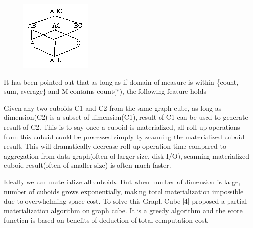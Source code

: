 \begin {figure}[H]
\centering
\includegraphics[scale=1]{pic/22.png}
\end{figure}

It has been pointed out that as long as if domain of measure is within \{count, sum, average\} and M contains count(*), the following feature holds:
 
Given any two cuboids C1 and C2 from the same graph cube, as long as dimension(C2) is a subset of dimension(C1), result of C1 can be used to generate result of C2. This is to say once a cuboid is materialized, all roll-up operations from this cuboid could be processed simply by scanning the materialized cuboid result. This will dramatically decrease roll-up operation time compared to aggregation from data graph(often of larger size, disk I/O), scanning materialized cuboid result(often of smaller size) is often much faster.


 
Ideally we can materialize all cuboids. But when number of dimension is large, number of cuboids grows exponentially, making total materialization impossible due to overwhelming space cost. To solve this Graph Cube [4] proposed a partial materialization algorithm on graph cube. It is a greedy algorithm and the score function is based on benefits of deduction of total computation cost.
